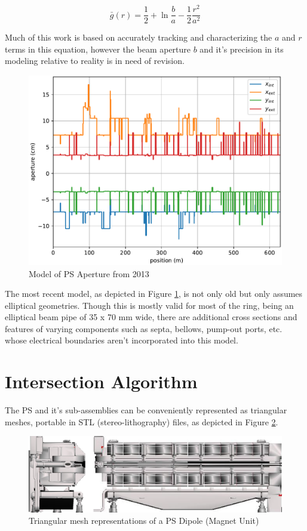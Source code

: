 $$\bar{g}(r) = \frac{1}{2} + \ln\frac{b}{a}-\frac{1}{2}\frac{r^2}{a^2}$$

Much of this work is based on accurately tracking and characterizing the $a$ and $r$ terms in this equation, however the beam aperture $b$ and it's precision in its modeling relative to reality is in need of revision.

\begin{figure}
    \centering
    \includegraphics{figs/ps_aperture.pdf}
    \caption{Model of PS Aperture from 2013}
    \label{fig:ps_aperture_model}
\end{figure}

The most recent model, as depicted in Figure \ref{fig:ps_aperture_model}, is not only old but only assumes elliptical geometries. Though this is mostly valid for most of the ring, being an elliptical beam pipe of 35 x 70 mm wide, there are additional cross sections and features of varying components such as septa, bellows, pump-out ports, etc. whose electrical boundaries aren't incorporated into this model.

\section{Intersection Algorithm}

The PS and it's sub-assemblies can be conveniently represented as triangular meshes, portable in STL (stereo-lithography) files, as depicted in Figure \ref{fig:ps_mu}.

\begin{figure}
    \centering
    \includegraphics{figs/ps_magnet.png}
    \caption{Triangular mesh representations of a PS Dipole (Magnet Unit)}
    \label{fig:ps_mu}
\end{figure}

